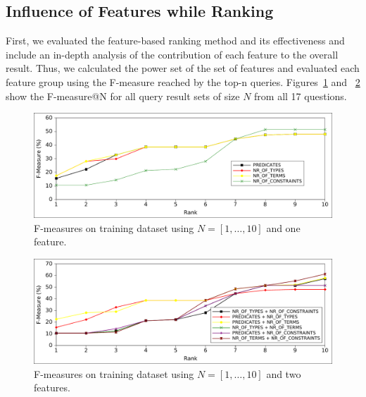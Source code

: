 \subsection{Influence of Features while Ranking}
First, we evaluated the feature-based ranking method and its effectiveness and include an in-depth analysis of the contribution of each feature to the overall result.
Thus, we calculated the power set of the set of features and evaluated each feature group using the F-measure reached by the top-n queries. 
Figures~\ref{chahawk:fig:ranking_1} and ~\ref{chahawk:fig:ranking_2} show the F-measure@N for all query result sets of size $N$ from all 17 questions. 
\begin{figure}[htb!]
\includegraphics[width=\linewidth]{part_03/ESWC_HAWK/onefeature}
\caption{F-measures on training dataset using $N=[1,\ldots,10]$ and one feature.}
\label{chahawk:fig:ranking_1}
\end{figure}
\begin{figure}[htb!]
\includegraphics[width=\linewidth]{part_03/ESWC_HAWK/twofeature}
\caption{F-measures on training dataset using $N=[1,\ldots,10]$ and two features.}
\label{chahawk:fig:ranking_2}
\end{figure}

